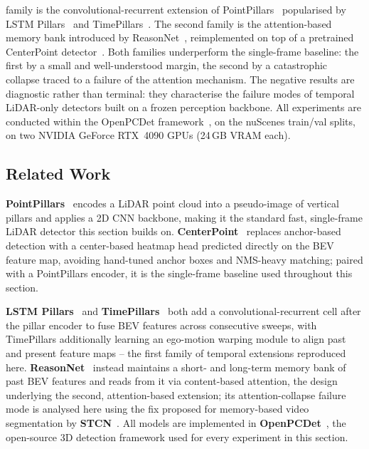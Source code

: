\documentclass[12pt,a4paper]{report}
\begin{document}
family is the convolutional-recurrent extension of
PointPillars~\cite{Lang2019PointPillars} popularised by LSTM
Pillars~\cite{Huang2020LSTMPillars} and
TimePillars~\cite{Hammarstrand2024TimePillars}. The second family is
the attention-based memory bank introduced by
ReasonNet~\cite{Shao2023ReasonNet}, reimplemented on top of a
pretrained CenterPoint detector~\cite{Yin2021CenterPoint}. Both
families underperform the single-frame baseline: the first by a
small and well-understood margin, the second by a catastrophic
collapse traced to a failure of the attention mechanism. The
negative results are diagnostic rather than terminal: they
characterise the failure modes of temporal LiDAR-only detectors
built on a frozen perception backbone.
All experiments are conducted within the OpenPCDet
framework~\cite{OpenPCDet2020}, on the nuScenes train/val splits,
on two NVIDIA GeForce RTX~4090 GPUs (24\,GB VRAM each).

\subsection{Related Work}
\quad \textbf{PointPillars}~\cite{Lang2019PointPillars} encodes a LiDAR point cloud into a pseudo-image of vertical pillars and applies a 2D CNN backbone, making it the standard fast, single-frame LiDAR detector this section builds on. \textbf{CenterPoint}~\cite{Yin2021CenterPoint} replaces anchor-based detection with a center-based heatmap head predicted directly on the BEV feature map, avoiding hand-tuned anchor boxes and NMS-heavy matching; paired with a PointPillars encoder, it is the single-frame baseline used throughout this section.

\quad \textbf{LSTM Pillars}~\cite{Huang2020LSTMPillars} and \textbf{TimePillars}~\cite{Hammarstrand2024TimePillars} both add a convolutional-recurrent cell after the pillar encoder to fuse BEV features across consecutive sweeps, with TimePillars additionally learning an ego-motion warping module to align past and present feature maps -- the first family of temporal extensions reproduced here. \textbf{ReasonNet}~\cite{Shao2023ReasonNet} instead maintains a short- and long-term memory bank of past BEV features and reads from it via content-based attention, the design underlying the second, attention-based extension; its attention-collapse failure mode is analysed here using the fix proposed for memory-based video segmentation by \textbf{STCN}~\cite{Cheng2021STCN}. All models are implemented in \textbf{OpenPCDet}~\cite{OpenPCDet2020}, the open-source 3D detection framework used for every experiment in this section.
\end{document}

